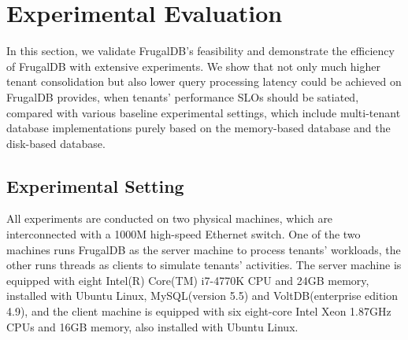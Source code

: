 \section{Experimental Evaluation}\label{sec:Experiments}
In this section, we validate FrugalDB's feasibility and demonstrate the efficiency of FrugalDB with extensive experiments. We show that not only much higher tenant consolidation but also lower query processing latency could be achieved on FrugalDB provides, when tenants' performance SLOs should be satiated, compared with various baseline experimental settings, which include multi-tenant database implementations purely based on the memory-based database and the disk-based database.

\subsection{Experimental Setting}
All experiments are conducted on two physical machines, which are interconnected with a 1000M high-speed Ethernet switch. One of the two machines runs FrugalDB as the server machine to process tenants' workloads, the other runs threads as clients to simulate tenants' activities. The server machine is equipped with eight Intel(R) Core(TM) i7-4770K CPU and 24GB memory, installed with Ubuntu Linux, MySQL(version 5.5) and VoltDB(enterprise edition 4.9), and the client machine is equipped with six eight-core Intel Xeon 1.87GHz CPUs and 16GB memory, also installed with Ubuntu Linux.

